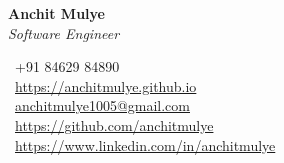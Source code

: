\begin{center}
    \begin{minipage}[t]{0.6\textwidth}
        \begin{center}
        {\Huge \textbf{Anchit Mulye}} \\[10pt]
        \vspace{5pt}
        {\LARGE \textit{\textcolor{secondarycolor}{\calligra Software Engineer}}}
        \end{center}
    \end{minipage}%
    \hfill
    \begin{minipage}[t]{0.4\textwidth}
        \raggedleft
        \faPhone \ +91 84629 84890 \\[5pt]
        \faGlobe \ \href{https://anchitmulye.github.io}{https://anchitmulye.github.io} \\[5pt]
        \faEnvelope \ \href{anchitmulye1005@gmail.com}{anchitmulye1005@gmail.com} \\[5pt]
        \faGithub \ \href{https://github.com/anchitmulye}{https://github.com/anchitmulye} \\[5pt]
        \faLinkedin \ \href{https://www.linkedin.com/in/anchitmulye}{https://www.linkedin.com/in/anchitmulye}
    \end{minipage}
\end{center}
